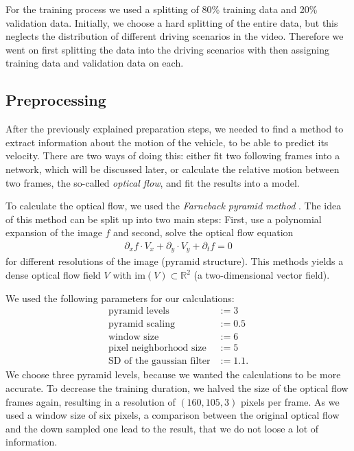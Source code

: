 \documentclass[conference]{IEEEtran}
\begin{document}
For the training process we used a splitting of 80\% training data and 20\% validation data. Initially, 
we choose a hard splitting of the entire data, but this neglects the distribution of different driving 
scenarios in the video. Therefore we went on first splitting the data into the driving scenarios with 
then assigning training data and validation data on each.

\subsection{Preprocessing}

After the previously explained preparation steps, we needed to find a method to extract information 
about the motion of the vehicle, to be able to predict its velocity. There are two ways of doing this: 
either fit two following frames into a network, which will be discussed later, or calculate the relative 
motion between two frames, the so-called \emph{optical flow}, and fit the results into a model.

To calculate the optical flow, we used the \emph{Farneback pyramid method} \cite{Farneback2003}.
The idea of this method can be split up into two main steps: First, use a polynomial expansion of the 
image $f$ and second, solve the optical flow equation
\begin{align*}
\partial_x f \cdot V_x + \partial_y \cdot V_y + \partial_t f = 0
\end{align*}
for different resolutions of the image (pyramid structure). This methods yields a dense optical flow 
field $V$ with $\mathrm{im}(V) \subset \mathbb{R}^2$ (a two-dimensional vector field).

We used the following parameters for our calculations:
\begin{align*}
\text{pyramid levels} &:= 3 \\
\text{pyramid scaling} &:= 0.5\\
\text{window size} &:= 6\\
\text{pixel neighborhood size} &:= 5\\
\text{SD of the gaussian filter} &:= 1.1.
\end{align*}
We choose three pyramid levels, because we wanted the calculations to be more accurate. To decrease the 
training duration, we halved the size of the optical flow frames again, resulting in a resolution of
$(160,105,3)$ pixels per frame. As we used a window size of six pixels, a comparison between the 
original optical flow and the down sampled one lead to the result, that we do not loose a lot of 
information.
\end{document}
